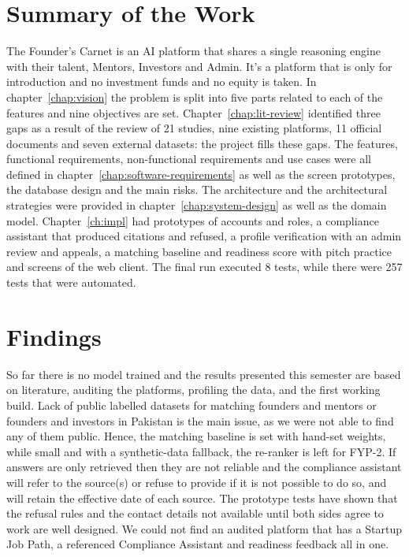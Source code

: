 \documentclass{FastFyp}
\begin{document}
\section{Summary of the Work}
The Founder's Carnet is an AI platform that shares a single reasoning engine with their talent, Mentors, Investors and Admin. It's a platform that is only for introduction and no investment funds and no equity is taken. In chapter~\ref{chap:vision} the problem is split into five parts related to each of the features and nine objectives are set. Chapter~\ref{chap:lit-review} identified three gaps as a result of the review of 21 studies, nine existing platforms, 11 official documents and seven external datasets: the project fills these gaps. The features, functional requirements, non-functional requirements and use cases were all defined in chapter~\ref{chap:software-requirements} as well as the screen prototypes, the database design and the main risks. The architecture and the architectural strategies were provided in chapter~\ref{chap:system-design} as well as the domain model. Chapter~\ref{ch:impl} had prototypes of accounts and roles, a compliance assistant that produced citations and refused, a profile verification with an admin review and appeals, a matching baseline and readiness score with pitch practice and screens of the web client. The final run executed 8 tests, while there were 257 tests that were automated.

\section{Findings}
So far there is no model trained and the results presented this semester are based on literature, auditing the platforms, profiling the data, and the first working build. Lack of public labelled datasets for matching founders and mentors or founders and investors in Pakistan is the main issue, as we were not able to find any of them public. Hence, the matching baseline is set with hand-set weights, while small and with a synthetic-data fallback, the re-ranker is left for FYP-2. If answers are only retrieved then they are not reliable and the compliance assistant will refer to the source(s) or refuse to provide if it is not possible to do so, and will retain the effective date of each source. The prototype tests have shown that the refusal rules and the contact details not available until both sides agree to work are well designed. We could not find an audited platform that has a Startup Job Path, a referenced Compliance Assistant and readiness feedback all in one.
\end{document}
